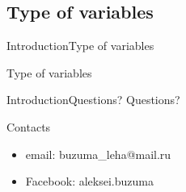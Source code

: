 \documentclass[10pt]{beamer}
\begin{document}
\subsection{Type of variables}
\begin{frame}{Introduction}{Type of variables}
\begin{block}{Type of variables}
	\typesPython
\end{block}

\end{frame}

\begin{frame}{Introduction}{Questions?}
\large Questions?
\begin{center}
	
	\begin{block}{Contacts}
		\begin{itemize}
			\item email:    buzuma\_leha@mail.ru
			\item Facebook: aleksei.buzuma
		\end{itemize}
	\end{block}
		
\end{center}


\end{frame}

%	
 		
\end{document}

